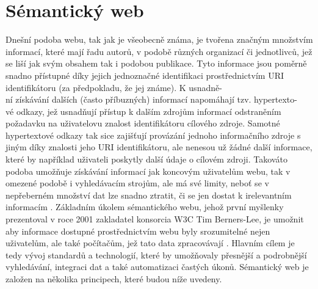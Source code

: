 \documentclass{projekt}
\begin{document}
\chapter{Sémantický web}
\hspace{0.65cm}Dnešní podoba webu, tak jak je všeobecně známa, je tvořena značným množstvím informací, které mají řadu autorů, v podobě různých organizací či jednotlivců, jež se liší jak svým obsahem tak i podobou publikace. Tyto informace jsou poměrně snadno přístupné díky jejich jednoznačné identifikaci prostřednictvím URI identifikátoru (za předpokladu, že jej známe). K usnadně-\\ní získávání dalších (často příbuzných) informací napomáhají tzv. hypertexto-\\vé odkazy, jež usnadňují přístup k dalším zdrojům informací odstraněním požadavku na uživatelovu znalost identifikátoru cílového zdroje. Samotné hypertextové odkazy tak sice zajišťují provázání jednoho informačního zdroje s jiným díky znalosti jeho URI identifikátoru, ale nenesou už žádné další informace, které by například uživateli poskytly další údaje o cílovém zdroji. 
Takováto podoba umožňuje získávání informací jak koncovým uživatelům webu, tak v omezené podobě i vyhledávacím strojům, ale má své limity, neboť se v nepřeberném množství dat lze snadno ztratit, či se jen dostat k irelevantním informacím \cite{_1}.
Základním úkolem sémantického webu, jehož první myšlenky prezentoval v roce 2001 zakladatel konsorcia W3C Tim Berners-Lee, je umožnit aby informace dostupné prostřednictvím webu byly srozumitelné nejen uživatelům, ale také počítačům, jež tato data zpracovávají \cite{_2}. Hlavním cílem je tedy vývoj standardů a technologií, které by umožňovaly přesnější a podrobnější vyhledávání, integraci dat a také automatizaci častých úkonů. 
Sémantický web je založen na několika principech, které budou níže uvedeny.
\end{document}
